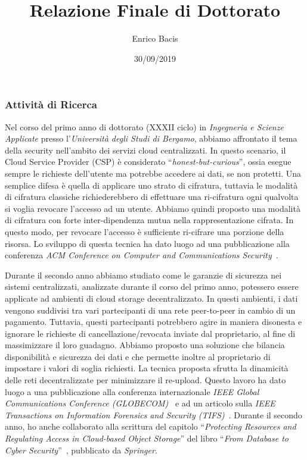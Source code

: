 \documentclass{article}
\begin{document}
\title{Relazione Finale di Dottorato}
\author{Enrico Bacis}
\date{30/09/2019}

\maketitle

\vspace{40px}

\subsubsection*{Attività di Ricerca}

Nel corso del primo anno di dottorato (XXXII ciclo) in {\em Ingegneria e Scienze Applicate} presso l'{\em Università degli Studi di Bergamo}, abbiamo affrontato il tema della security nell'ambito dei servizi cloud centralizzati. In questo scenario, il Cloud Service Provider (CSP) è considerato ``{\em honest-but-curious}'', ossia esegue sempre le richieste dell'utente ma potrebbe accedere ai dati, se non protetti. Una semplice difesa è quella di applicare uno strato di cifratura, tuttavia le modalità di cifratura classiche richiederebbero di effettuare una ri-cifratura ogni qualvolta si voglia revocare l'accesso ad un utente. Abbiamo quindi proposto una modalità di cifratura con forte inter-dipendenza mutua nella rappresentazione cifrata. In questo modo, per revocare l'accesso è sufficiente ri-cifrare una porzione della risorsa. Lo sviluppo di questa tecnica ha dato luogo ad una pubblicazione alla conferenza {\em ACM Conference on Computer and Communications Security}~\cite{ccs}.

\medskip
Durante il secondo anno abbiamo studiato come le garanzie di sicurezza nei sistemi centralizzati, analizzate durante il corso del primo anno, potessero essere applicate ad ambienti di cloud storage decentralizzato. In questi ambienti, i dati vengono suddivisi tra vari partecipanti di una rete peer-to-peer in cambio di un pagamento. Tuttavia, questi partecipanti potrebbero agire in maniera disonesta e ignorare le richieste di cancellazione/revocata inviate dal proprietario, al fine di massimizzare il loro guadagno.
Abbiamo proposto una soluzione che bilancia disponibilità e sicurezza dei dati e che permette inoltre al proprietario di impostare i valori di soglia richiesti. La tecnica proposta sfrutta la dinamicità delle reti decentralizzate per minimizzare il re-upload.
Questo lavoro ha dato luogo a una pubblicazione alla conferenza internazionale {\em  IEEE Global Communications Conference (GLOBECOM)}~\cite{globecom} e ad un articolo sulla {\em IEEE Transactions on Information Forensics and Security (TIFS)}~\cite{tifs}.
Durante il secondo anno, ho anche collaborato alla scrittura del capitolo ``{\em Protecting Resources and Regulating Access in Cloud-based Object Storage}'' del libro ``{\em From Database to Cyber Security}''~\cite{sushil}, pubblicato da {\em Springer}.
\end{document}
